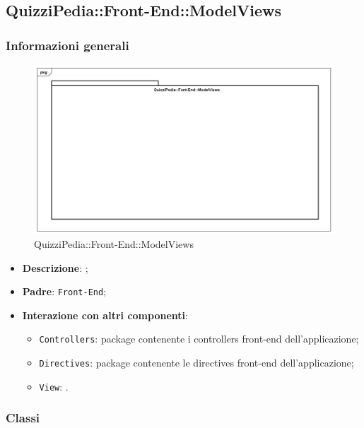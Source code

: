 \newpage

\subsection{QuizziPedia::Front-End::ModelViews}
\subsubsection{Informazioni generali}
\label{QuizziPedia::Front-End::ModelViews}
\begin{figure}
	\centering
	\includegraphics[scale=0.45]{UML/Package/QuizziPedia_Front-End_ModelViews.png}
	\caption{QuizziPedia::Front-End::ModelViews}
\end{figure}
\begin{itemize}
	\item \textbf{Descrizione}: ;
	\item \textbf{Padre}: \texttt{Front-End};
	\item \textbf{Interazione con altri componenti}:
	\begin{itemize}
		\item \texttt{Controllers}: package contenente i controllers front-end dell'applicazione;
		\item \texttt{Directives}: package contenente le directives front-end dell'applicazione;
		\item \texttt{View}: .
	\end{itemize}
\end{itemize}
\subsubsection{Classi}


